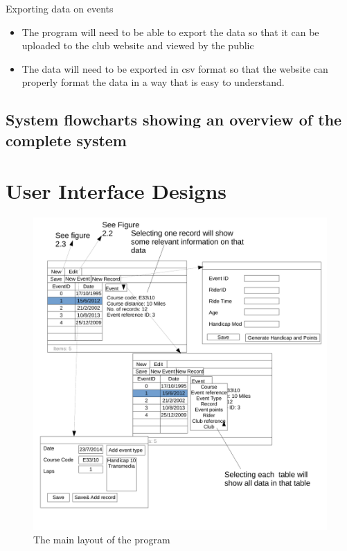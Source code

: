Exporting data on events
\begin{itemize}
	\item The program will need to be able to export the data so that it can be uploaded to the club website and viewed by the public
	\item The data will need to be exported in csv format so that the website can properly format the data in a way that is easy to understand.
\end{itemize}

\subsection{System flowcharts showing an overview of the complete system}

\section{User Interface Designs}
\begin{figure}[H]
	\includegraphics[width=\textwidth]{./UIDesign/BaseMainDrop.pdf}
	\caption{The main layout of the program} \label{fig:The main layout of the program} 	
\end{figure}

